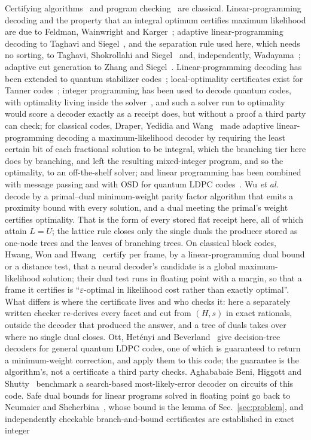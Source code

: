 \documentclass[aps,pra,twocolumn,superscriptaddress,nofootinbib,longbibliography,floatfix]{revtex4-2}
\begin{document}
Certifying algorithms~\cite{mcconnell2011certifying} and program checking~\cite{blumkannan1995} are classical. Linear-programming decoding and the property that an integral optimum certifies maximum likelihood are due to Feldman, Wainwright and Karger~\cite{feldman2005lp}; adaptive linear-programming decoding to Taghavi and Siegel~\cite{taghavi2008adaptive}, and the separation rule used here, which needs no sorting, to Taghavi, Shokrollahi and Siegel~\cite{taghavi2011efficient} and, independently, Wadayama~\cite{wadayama2010interior}; adaptive cut generation to Zhang and Siegel~\cite{zhangsiegel2012adaptive}. Linear-programming decoding has been extended to quantum stabilizer codes~\cite{li2018lp}; local-optimality certificates exist for Tanner codes~\cite{halabi2011local}; integer programming has been used to decode quantum codes, with optimality living inside the solver~\cite{landahl2011fault}, and such a solver run to optimality would score a decoder exactly as a receipt does, but without a proof a third party can check; for classical codes, Draper, Yedidia and Wang~\cite{draper2007ml} made adaptive linear-programming decoding a maximum-likelihood decoder by requiring the least certain bit of each fractional solution to be integral, which the branching tier here does by branching, and left the resulting mixed-integer program, and so the optimality, to an off-the-shelf solver; and linear programming has been combined with message passing and with OSD for quantum LDPC codes~\cite{javed2023low,gu2025power}. Wu \textit{et al.}~\cite{wu2025minimum} decode by a primal--dual minimum-weight parity factor algorithm that emits a proximity bound with every solution, and a dual meeting the primal's weight certifies optimality. That is the form of every stored flat receipt here, all of which attain $L=U$; the lattice rule closes only the single duals the producer stored as one-node trees and the leaves of branching trees. On classical block codes, Hwang, Won and Hwang~\cite{hwang2026certified} certify per frame, by a linear-programming dual bound or a distance test, that a neural decoder's candidate is a global maximum-likelihood solution; their dual test runs in floating point with a margin, so that a frame it certifies is ``$\varepsilon$-optimal in likelihood cost rather than exactly optimal''. What differs is where the certificate lives and who checks it: here a separately written checker re-derives every facet and cut from $(H,s)$ in exact rationals, outside the decoder that produced the answer, and a tree of duals takes over where no single dual closes. Ott, Het\'enyi and Beverland~\cite{ott2025decision} give decision-tree decoders for general quantum LDPC codes, one of which is guaranteed to return a minimum-weight correction, and apply them to this code; the guarantee is the algorithm's, not a certificate a third party checks. Aghababaie Beni, Higgott and Shutty~\cite{beni2025tesseract} benchmark a search-based most-likely-error decoder on circuits of this code. Safe dual bounds for linear programs solved in floating point go back to Neumaier and Shcherbina~\cite{neumaier2004safe}, whose bound is the lemma of Sec.~\ref{sec:problem}, and independently checkable branch-and-bound certificates are established in exact integer 
\end{document}
